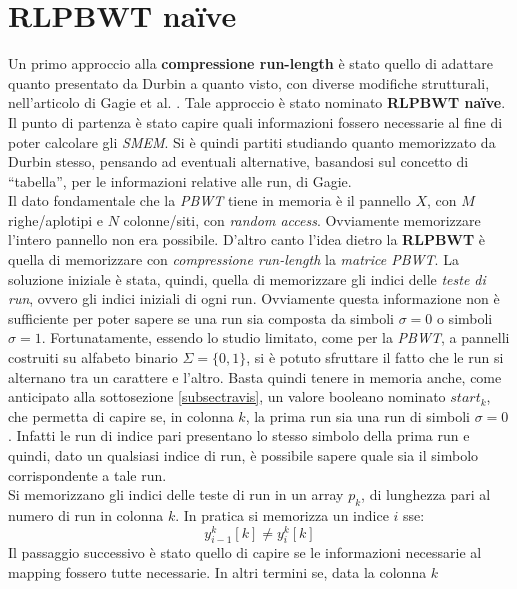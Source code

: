 \section{RLPBWT na\"{i}ve}
\label{secrlpbwtnaive}
Un primo approccio alla \textbf{compressione run-length} è stato quello di
adattare quanto presentato da Durbin \cite{pbwt} a quanto visto, con diverse
modifiche strutturali, nell'articolo di
Gagie et al. \cite{tricks}. Tale approccio è stato nominato \textbf{RLPBWT
  na\"{i}ve}.\\ 
Il punto di partenza è stato capire quali informazioni fossero necessarie al
fine di poter calcolare gli \textit{SMEM}. Si è quindi partiti studiando quanto
memorizzato da Durbin stesso, pensando ad eventuali alternative, basandosi sul
concetto di ``tabella'', per le informazioni relative alle run, di Gagie.\\
Il dato fondamentale che la \textit{PBWT} tiene in memoria è il pannello
$X$, con $M$ righe/aplotipi e $N$ colonne/siti, con \textit{random
  access}. Ovviamente memorizzare l'intero pannello non era 
possibile. D'altro canto l'idea dietro la 
\textbf{RLPBWT} è quella di memorizzare con \textit{compressione run-length}
la \textit{matrice PBWT}. La soluzione iniziale è stata, quindi, quella di
memorizzare gli indici delle \textit{teste di run}, ovvero gli indici iniziali
di ogni run. Ovviamente questa informazione non è sufficiente per poter sapere
se una run sia composta da simboli $\sigma=0$ o simboli
$\sigma=1$. Fortunatamente, essendo lo studio limitato, come per la
\textit{PBWT}, a pannelli costruiti su alfabeto binario $\Sigma=\{0,1\}$, si è
potuto sfruttare il fatto che le run si alternano tra un carattere e
l'altro. Basta quindi tenere in memoria anche, come
anticipato alla sottosezione \ref{subsectravis}, un valore booleano nominato
$start_k$, che permetta di 
capire se, in colonna $k$, la prima run sia una run di simboli
$\sigma=0$. Infatti le run di 
indice pari presentano lo stesso simbolo della prima run e quindi, dato un
qualsiasi indice di run, è possibile sapere quale sia il simbolo corrispondente
a tale run.\\ 
Si memorizzano gli indici delle teste di run in un array $p_k$, di lunghezza
pari al numero di run in colonna $k$. In pratica si memorizza un indice $i$ sse:
\begin{equation}
  \label{eq:naive1}
  y_{i-1}^k[k]\neq y_i^k[k]
\end{equation}
Il passaggio successivo è stato quello di capire se le informazioni necessarie
al mapping fossero tutte necessarie. In altri termini se, data la colonna $k$
